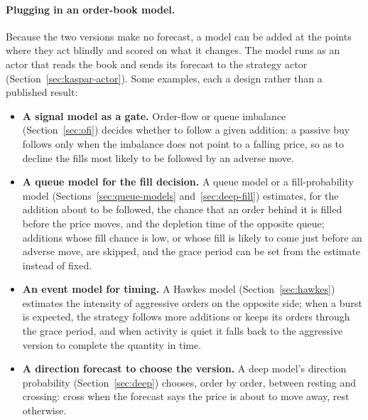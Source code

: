\paragraph{Plugging in an order-book model.} Because the two versions make no forecast, a model can be added at the
points where they act blindly and scored on what it changes. The model runs as an actor that reads the book and sends
its forecast to the strategy actor (Section~\ref{sec:kaspar-actor}). Some examples, each a design rather than a published
result:
\begin{itemize}[leftmargin=1.5em,itemsep=2pt]
\item \textbf{A signal model as a gate.} Order-flow or queue imbalance (Section~\ref{sec:ofi}) decides whether to follow
  a given addition: a passive buy follows only when the imbalance does not point to a falling price, so as to decline
  the fills most likely to be followed by an adverse move.
\item \textbf{A queue model for the fill decision.} A queue model or a fill-probability model
  (Sections~\ref{sec:queue-models} and~\ref{sec:deep-fill}) estimates, for the addition about to be followed, the chance
  that an order behind it is filled before the price moves, and the depletion time of the opposite queue; additions
  whose fill chance is low, or whose fill is likely to come just before an adverse move, are skipped, and the grace
  period can be set from the estimate instead of fixed.
\item \textbf{An event model for timing.} A Hawkes model (Section~\ref{sec:hawkes}) estimates the intensity of
  aggressive orders on the opposite side; when a burst is expected, the strategy follows more additions or keeps its
  orders through the grace period, and when activity is quiet it falls back to the aggressive version to complete the
  quantity in time.
\item \textbf{A direction forecast to choose the version.} A deep model's direction probability
  (Section~\ref{sec:deep}) chooses, order by order, between resting and crossing: cross when the forecast says the
  price is about to move away, rest otherwise.
\end{itemize}

